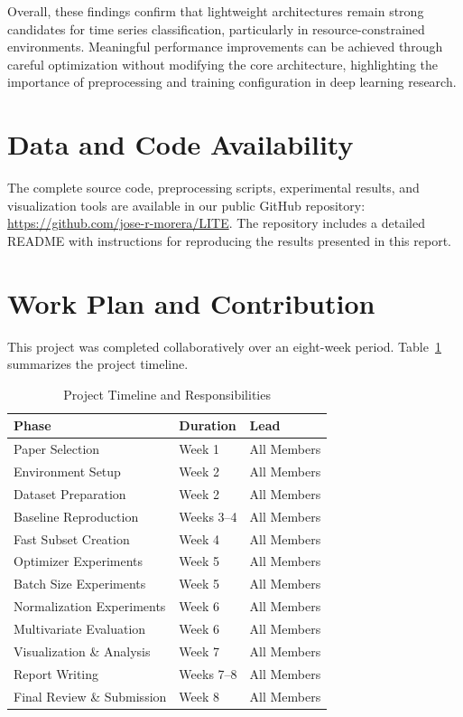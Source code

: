 \documentclass[conference]{IEEEtran}
\begin{document}
Overall, these findings confirm that lightweight architectures remain strong candidates for time series classification, particularly in resource-constrained environments. Meaningful performance improvements can be achieved through careful optimization without modifying the core architecture, highlighting the importance of preprocessing and training configuration in deep learning research.

\section*{Data and Code Availability}

The complete source code, preprocessing scripts, experimental results, and visualization tools are available in our public GitHub repository: \url{https://github.com/jose-r-morera/LITE}. The repository includes a detailed README with instructions for reproducing the results presented in this report.

\section*{Work Plan and Contribution}

This project was completed collaboratively over an eight-week period. Table~\ref{tab:workplan} summarizes the project timeline.

\begin{table}[htbp]
\caption{Project Timeline and Responsibilities}
\label{tab:workplan}
\centering
\small
\begin{tabular}{lll}
\toprule
\textbf{Phase} & \textbf{Duration} & \textbf{Lead} \\
\midrule
Paper Selection & Week 1 & All Members \\
Environment Setup & Week 2 & All Members \\
Dataset Preparation & Week 2 & All Members \\
Baseline Reproduction & Weeks 3--4 & All Members \\
Fast Subset Creation & Week 4 & All Members \\
Optimizer Experiments & Week 5 & All Members \\
Batch Size Experiments & Week 5 & All Members \\
Normalization Experiments & Week 6 & All Members \\
Multivariate Evaluation & Week 6 & All Members \\
Visualization \& Analysis & Week 7 & All Members \\
Report Writing & Weeks 7--8 & All Members \\
Final Review \& Submission & Week 8 & All Members \\
\bottomrule
\end{tabular}
\end{table}
\end{document}

